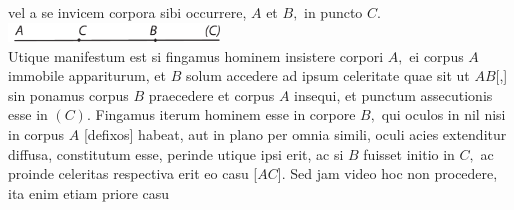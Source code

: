 vel a se invicem 
corpora sibi occurrere, $\displaystyle A$ et $\displaystyle B,$ in puncto $\displaystyle C.$
\protect\includegraphics[width=0.42\textwidth]{images/LH035,14,02_112v-d3.pdf}\\%
\vspace{-1em}
\pend
\count{}
\count{}
\count{}
\pstart
\noindent
Utique manifestum est si fingamus hominem insistere corpori $\displaystyle A,$
ei corpus $\displaystyle A$ immobile appariturum,
et $\displaystyle B$ solum accedere ad ipsum celeritate quae sit ut $\displaystyle AB$[,]
sin ponamus corpus $\displaystyle B$ praecedere et corpus $\displaystyle A$ insequi,
et punctum assecutionis esse in $\displaystyle (C).$
Fingamus iterum hominem esse in corpore $\displaystyle B,$
qui oculos in nil nisi in corpus $\displaystyle A$
[defixos]
habeat, aut in plano per omnia simili,
oculi acies extenditur diffusa, constitutum esse,
perinde utique ipsi erit,
ac si $\displaystyle B$ fuisset initio in $\displaystyle C,$
ac proinde celeritas respectiva erit eo casu [$\displaystyle AC$].
\pend
\pstart
Sed jam video hoc non procedere,
ita enim etiam priore casu

